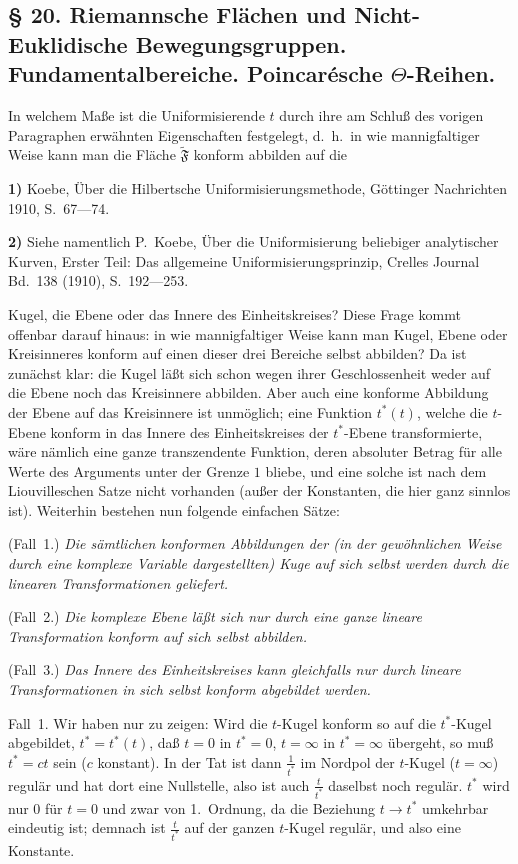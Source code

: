 \documentclass{article}
\begin{document}
\subsection*{§ 20. Riemannsche Flächen und Nicht-Euklidische Bewegungsgruppen. Fundamentalbereiche. Poincarésche $\Theta$-Reihen.}

In welchem Maße ist die Uniformisierende $t$ durch ihre am Schluß des vorigen Paragraphen erwähnten Eigenschaften festgelegt, d.~h.\ in wie mannigfaltiger Weise kann man die Fläche $\widetilde{\mathfrak{F}}$ konform abbilden auf die

\textbf{1)} Koebe, Über die Hilbertsche Uniformisierungsmethode, Göttinger Nachrichten 1910, S.~67---74.

\textbf{2)} Siehe namentlich P.~Koebe, Über die Uniformisierung beliebiger analytischer Kurven, Erster Teil: Das allgemeine Uniformisierungsprinzip, Crelles Journal Bd.~138 (1910), S.~192---253.

Kugel, die Ebene oder das Innere des Einheitskreises? Diese Frage kommt offenbar darauf hinaus: in wie mannigfaltiger Weise kann man Kugel, Ebene oder Kreisinneres konform auf einen dieser drei Bereiche selbst abbilden? Da ist zunächst klar: die Kugel läßt sich schon wegen ihrer Geschlossenheit weder auf die Ebene noch das Kreisinnere abbilden. Aber auch eine konforme Abbildung der Ebene auf das Kreisinnere ist unmöglich; eine Funktion $t^*(t)$, welche die $t$-Ebene konform in das Innere des Einheitskreises der $t^*$-Ebene transformierte, wäre nämlich eine ganze transzendente Funktion, deren absoluter Betrag für alle Werte des Arguments unter der Grenze $1$ bliebe, und eine solche ist nach dem Liouvilleschen Satze nicht vorhanden (außer der Konstanten, die hier ganz sinnlos ist). Weiterhin bestehen nun folgende einfachen Sätze:

(Fall~1.) \emph{Die sämtlichen konformen Abbildungen der (in der gewöhnlichen Weise durch eine komplexe Variable dargestellten) Kuge auf sich selbst werden durch die linearen Transformationen geliefert.}

(Fall~2.) \emph{Die komplexe Ebene läßt sich nur durch eine ganze lineare Transformation konform auf sich selbst abbilden.}

(Fall~3.) \emph{Das Innere des Einheitskreises kann gleichfalls nur durch lineare Transformationen in sich selbst konform abgebildet werden.}

Fall~1. Wir haben nur zu zeigen: Wird die $t$-Kugel konform so auf die $t^*$-Kugel abgebildet, $t^* = t^*(t)$, daß $t = 0$ in $t^* = 0$, $t = \infty$ in $t^* = \infty$ übergeht, so muß $t^* = ct$ sein ($c$ konstant). In der Tat ist dann $\frac{1}{t^*}$ im Nordpol der $t$-Kugel ($t = \infty$) regulär und hat dort eine Nullstelle, also ist auch $\frac{t}{t^*}$ daselbst noch regulär. $t^*$ wird nur $0$ für $t = 0$ und zwar von 1.~Ordnung, da die Beziehung $t \to t^*$ umkehrbar eindeutig ist; demnach ist $\frac{t}{t^*}$ auf der ganzen $t$-Kugel regulär, und also eine Konstante.
\end{document}
